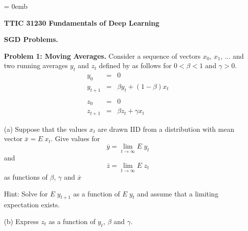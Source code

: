 \documentclass{article}
\newcommand{\solution}[1]{}
\begin{document}
\parindent = 0emb


\centerline{\bf TTIC 31230 Fundamentals of Deep Learning}
\bigskip
\centerline{\bf SGD Problems.}


\bigskip
{\bf Problem 1: Moving Averages.}  Consider a sequence of vectors $x_0$, $x_1$, $\ldots$ and two running averages $y_t$ and $z_t$ defined by
as follows for $0 < \beta < 1$ and $\gamma > 0$.
\begin{eqnarray*}
  y_0 & = & 0 \\
  y_{t+1} & = & \beta y_t + (1-\beta) x_t
  \\
  \\
  z_0 & = & 0 \\
  z_{t+1} & = & \beta z_t + \gamma x_t
\end{eqnarray*}

(a) Suppose that the values $x_t$ are drawn IID from a distribution with mean vector $\overline{x} = E\;x_t$.  Give values for
$$\overline{y} = \lim_{t \rightarrow \infty} E \;y_t$$
and
$$\overline{z} = \lim_{t \rightarrow \infty} E \;z_t$$
as functions of $\beta$, $\gamma$ and $\overline{x}$

Hint: Solve for $E\;y_{t+1}$ as a function of $E\;y_t$ and assume that a limiting expectation exists.

\solution{
  \begin{eqnarray*}
   E\; y_{t+1} & = & \beta \;E\;y_t + (1-\beta) \; E\;x_t \\
   \overline{y} & = & \beta \;\overline{y} + (1-\beta)\; \overline{x} \\
   (1-\beta)\;\overline{y} & = & (1-\beta)\;\overline{x} \\
   \overline{y} & = & \overline{x}
  \end{eqnarray*}

  \begin{eqnarray*}
   E\; z_{t+1} & = & \beta \;E\;z_t + \gamma\; E\;x_t \\
   \overline{z} & = & \beta \;\overline{z} + \gamma\; \overline{x} \\
   (1-\beta)\;\overline{z} & = & \gamma\;\overline{x} \\
   \overline{z} & = & \frac{\gamma}{1-\beta}\;\overline{x}
  \end{eqnarray*}

}


(b) Express $z_t$ as a function of $y_t$, $\beta$ and $\gamma$.

\solution{
  \begin{eqnarray*}
    z_{t+1} & = & \beta \;z_t + \gamma\;x_t \\
    & = & \sum_{t'= 0}^t \gamma \beta^{t-t'} x_{t'} \\
    & = & \frac{\gamma}{1-\beta}\;\sum_{t'=0}^t (1-\beta)\beta^{t-t'} x_t \\
    & = & \frac{\gamma}{1-\beta}\;y_{t+1}
  \end{eqnarray*}
}
\end{document}
